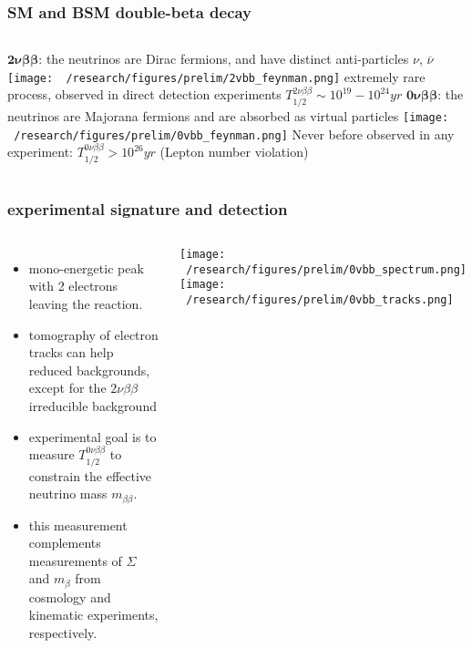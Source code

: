 \documentclass{beamer}
\begin{document}
	\begin{frame}
		\frametitle{SM and BSM double-beta decay}
		\begin{columns}[c] %
			{\footnotesize $\boldsymbol{2\nu\beta\beta}$: the neutrinos are Dirac fermions, and have distinct anti-particles $\nu$, $\overline{\nu}$} 
			\medskip
			\texttt{[image: ~/research/figures/prelim/2vbb\_feynman.png]}
			{\footnotesize extremely rare process, observed in direct detection experiments $T_{1/2}^{2\nu\beta\beta} \sim 10^{19}-10^{24} yr$}
			{\footnotesize $\boldsymbol{0\nu\beta\beta}$: the neutrinos are Majorana fermions and are absorbed as virtual particles}
			\texttt{[image: ~/research/figures/prelim/0vbb\_feynman.png]}
			{\footnotesize Never before observed in any experiment:  $T_{1/2}^{0\nu\beta\beta} > 10^{26} yr$  (Lepton number violation)}
			
		\end{columns}
	\end{frame}		
	
	\begin{frame}
		\frametitle{experimental signature and detection}
		\begin{columns}[c] %
			
			\begin{itemize}
				\setlength\itemsep{2em}
				\item mono-energetic peak with 2 electrons leaving the reaction.
				\item tomography of electron tracks can help reduced backgrounds, except for the $2\nu\beta\beta$ irreducible background
				\item experimental goal is to measure $T_{1/2}^{0\nu\beta\beta}$ to constrain the effective neutrino mass $m_{\beta\beta}$.
				\item this measurement complements measurements of $\Sigma$ and $m_{\beta}$ from cosmology and kinematic experiments, respectively.
			\end{itemize}
			
			\texttt{[image: ~/research/figures/prelim/0vbb\_spectrum.png]}
			\texttt{[image: ~/research/figures/prelim/0vbb\_tracks.png]}
			
		\end{columns}
	\end{frame}			
	
\end{document}
